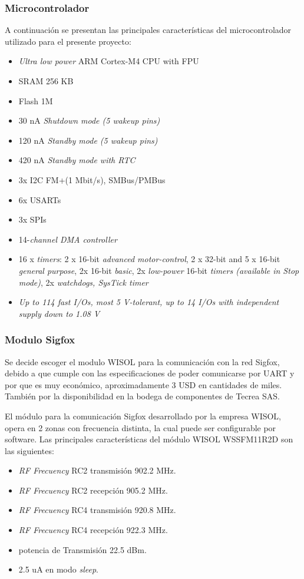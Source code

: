 \subsubsection{Microcontrolador}
A continuación se presentan las principales características del microcontrolador utilizado para el presente proyecto:
\begin{itemize}
    \item \textit{Ultra low power} ARM Cortex\textregistered-M4  CPU with FPU
    \item  SRAM 256 KB
    \item  Flash 1M
    \item 30 nA \textit{Shutdown mode (5 wakeup pins)}
    \item 120 nA \textit{Standby mode (5 wakeup pins)}
    \item 420 nA \textit{Standby mode with RTC}
   \item 3x I2C FM+(1 Mbit/s), SMBus/PMBus 
   \item 6x USARTs
   \item 3x SPIs
   \item 14-\textit{channel DMA controller}
    \item 16 x \textit{ timers}: 2 x 16-bit \textit{advanced motor-control}, 2 x 32-bit and 5 x 16-bit \textit{general purpose}, 2x 16-bit \textit{basic}, 2x \textit{low-power} 16-bit \textit{timers (available in Stop mode)}, 2x \textit{watchdogs, SysTick timer}
    \item \textit{Up to 114 fast I/Os, most 5 V-tolerant, up to 14 I/Os with independent supply down to 1.08 V}
\end{itemize}



\subsubsection{Modulo Sigfox}
Se decide escoger el modulo WISOL para la comunicación con la red Sigfox,  debido a que cumple con las especificaciones de poder comunicarse por UART y por que es muy económico, aproximadamente 3 USD en cantidades de miles. También por la disponibilidad en la bodega de componentes de Tecrea SAS.

El módulo para la comunicación Sigfox desarrollado por la empresa WISOL, opera en 2 zonas con frecuencia distinta, la cual puede ser configurable por software. Las principales características del módulo WISOL WSSFM11R2D\cite{Laboratory2001}  son las siguientes:
\begin{itemize}
    \item \textit{RF Frecuency} RC2 transmisión 902.2 MHz.
    \item \textit{RF Frecuency} RC2 recepción 905.2 MHz.
    \item \textit{RF Frecuency} RC4 transmisión 920.8 MHz.
    \item \textit{RF Frecuency} RC4 recepción 922.3 MHz.
    \item potencia de Transmisión 22.5 dBm.
    \item 2.5 uA en modo \textit{sleep}.
\end{itemize}

